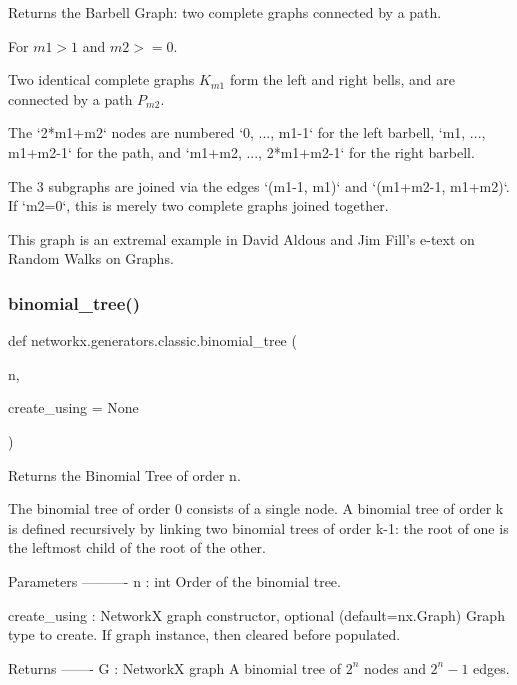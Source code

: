 \begin{DoxyVerb}Returns the Barbell Graph: two complete graphs connected by a path.

For $m1 > 1$ and $m2 >= 0$.

Two identical complete graphs $K_{m1}$ form the left and right bells,
and are connected by a path $P_{m2}$.

The `2*m1+m2`  nodes are numbered
    `0, ..., m1-1` for the left barbell,
    `m1, ..., m1+m2-1` for the path,
    and `m1+m2, ..., 2*m1+m2-1` for the right barbell.

The 3 subgraphs are joined via the edges `(m1-1, m1)` and
`(m1+m2-1, m1+m2)`. If `m2=0`, this is merely two complete
graphs joined together.

This graph is an extremal example in David Aldous
and Jim Fill's e-text on Random Walks on Graphs.\end{DoxyVerb}
 \mbox{\label{namespacenetworkx_1_1generators_1_1classic_a3b533c7cec64040c4ffdab95fcb98087}} 
\subsubsection{\texorpdfstring{binomial\+\_\+tree()}{binomial\_tree()}}
{\footnotesize\ttfamily def networkx.\+generators.\+classic.\+binomial\+\_\+tree (\begin{DoxyParamCaption}\item[{}]{n,  }\item[{}]{create\+\_\+using = {\ttfamily None} }\end{DoxyParamCaption})}

\begin{DoxyVerb}Returns the Binomial Tree of order n.

The binomial tree of order 0 consists of a single node. A binomial tree of order k
is defined recursively by linking two binomial trees of order k-1: the root of one is
the leftmost child of the root of the other.

Parameters
----------
n : int
    Order of the binomial tree.

create_using : NetworkX graph constructor, optional (default=nx.Graph)
   Graph type to create. If graph instance, then cleared before populated.

Returns
-------
G : NetworkX graph
    A binomial tree of $2^n$ nodes and $2^n - 1$ edges.\end{DoxyVerb}
 \mbox{\label{namespacenetworkx_1_1generators_1_1classic_abac2eb1c298413c763ae6377ff0c3181}} 
